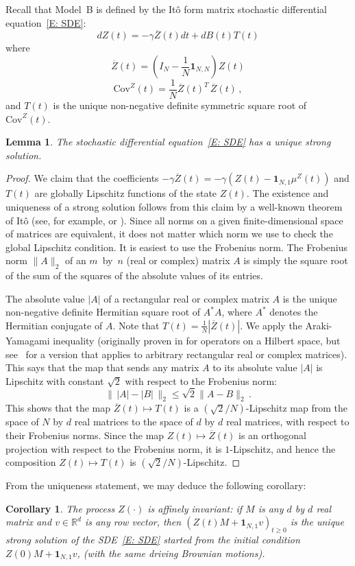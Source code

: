 \documentclass[12pt]{article}
\newtheorem{lemma}{Lemma}
\newtheorem{corollary}{Corollary}
\newcommand{\Cov}{\mathrm{Cov}}
\newcommand{\1}{\mathbf{1}}
\begin{document}
Recall that Model~B is defined by the It\^{o} form matrix stochastic differential equation~\eqref{E: SDE}:
$$ dZ(t) = -\gamma\overline{Z}(t) dt +   dB(t) T(t)$$
where
$$ \overline{Z}(t) =   \left(I_N- \frac{1}{N}\mathbf{1}_{N,N}\right)Z(t)$$
$$ 
\Cov^Z(t) = \frac{1}{N} \overline{Z}(t)^T\, \overline{Z}(t)\,,
$$
and $T(t)$ is the unique non-negative definite symmetric square root of $\Cov^Z(t)$. 
\begin{lemma}\label{L: SDE is well posed} The stochastic differential equation~\eqref{E: SDE} has a unique strong solution.\end{lemma}
\begin{proof}
We claim that the coefficients $- \gamma\overline{Z}(t) = -\gamma\left(Z(t) - \mathbf{1}_{N,1}\mu^Z(t)\right)$ and $T(t)$ are globally Lipschitz functions of the state $Z(t)$. The existence and uniqueness of a strong solution follows from this claim by a well-known theorem of It\^{o} (see, for example, \cite[Thm IV.3.1]{Ikeda} or \cite[Thms 5.2.5 and 5.2.9]{Karatzas}). 
Since all norms on a given finite-dimensional space of matrices are equivalent, it does not matter which norm we use to check the global Lipschitz condition. It is easiest to use the Frobenius norm. The Frobenius norm $\|A\|_2$ of an $m$~by~$n$ (real or complex) matrix $A$ is simply the square root of the sum of the squares of the absolute values of its entries.  

The absolute value {$|A|$} of a rectangular real or complex matrix $A$ is the unique non-negative definite Hermitian square root of $A^*A$, where $A^*$ denotes the Hermitian conjugate of $A$. Note that $T(t) = \frac{1}{N}\left|\overline{Z}(t)\right|$. We apply the Araki-Yamagami inequality (originally proven in \cite[Thm~1]{Araki} for operators on a Hilbert space, but see~\cite[Thm~VII.5.7, eqn~VII.39]{Bhatia} for a version that applies to arbitrary rectangular real or complex matrices). This says that the map that sends any matrix $A$ to its absolute value $|A|$ is Lipschitz with constant $\sqrt{2}$ with respect to the Frobenius norm:
\begin{equation}
\label{E: Araki-Yamagami inequality} 
\|\, |A| - |B|\,\|_2 \le \sqrt{2} \| A - B\|_2\,.
\end{equation}
This shows that the map $\overline{Z}(t) \mapsto T(t)$ is a $(\sqrt{2}/N)$-Lipschitz map from the space of $N$ by $d$ real matrices to the space of $d$ by $d$ real matrices, with respect to their Frobenius norms.
Since the map $Z(t) \mapsto \overline{Z}(t)$ is an orthogonal projection with respect to the Frobenius norm, it is $1$-Lipschitz, and hence the composition $Z(t) \mapsto T(t)$ is $(\sqrt{2}/N)$-Lipschitz.
\end{proof}
From the uniqueness statement, we may deduce the following corollary:
\begin{corollary}
The process $Z(\cdot)$ is affinely invariant:  if $M$ is any $d$ by $d$ real matrix and $v \in \mathbb{R}^d$ is any row vector, then $(Z(t)M + \mathbf{1}_{N,1}v)_{t \ge 0}$ is the unique strong solution of the SDE~\eqref{E: SDE} started from the initial condition $Z(0)M + \mathbf{1}_{N,1}v$, (with the same driving Brownian motions).
\end{corollary}
\end{document}
